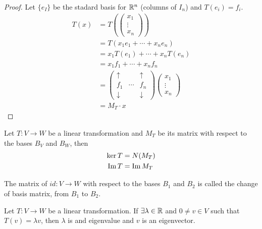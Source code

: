 \documentclass[a4paper,10pt]{article}
\begin{document}
\begin{proof}
	Let $\{e_I\}$ be the stadard basis for $\mathbb{R}^n$ (columns of $I_n$) and $T(e_i) = f_i$.
	\begin{align*}
		T(x) &= T
		\left(
			\begin{pmatrix}
				x_1 \\
				\vdots \\
				x_n
			\end{pmatrix}
		\right) \\
		&= T(x_1 e_1 + \cdots + x_n e_n) \\
		&= x_1 T(e_1) + \cdots + x_n T(e_n) \\
		&= x_1 f_1 + \cdots + x_n f_n \\
		&=
		\begin{pmatrix}
			\uparrow   &        & \uparrow \\
			f_1        & \cdots & f_n      \\
			\downarrow &        & \downarrow
		\end{pmatrix}
		\begin{pmatrix}
			x_1 \\
			\vdots \\
			x_n
		\end{pmatrix} \\
		&= M_T \cdot x
	\end{align*}
\end{proof}

\begin{cor}
	Let $T:V \to W$ be a linear transformation and $M_T$ be its
	matrix with respect to the bases $B_V$ and $B_W$, then
	\begin{align*}
		\ker T & = N(M_T) \\
		\operatorname{Im} T  & = \operatorname{Im} M_T
	\end{align*}
\end{cor}

\begin{defn}
	The matrix of $id:V \to W$ with respect to the bases $B_1$ and
	$B_2$ is called the change of basis matrix, from $B_1$ to $B_2$.
\end{defn}

\begin{defn}
	Let $T:V \to W$ be a linear transformation. If $\exists \lambda
	\in \mathbb{R}$ and $0 \neq v \in V$ such that $T(v) = \lambda v$, then
	$\lambda$ is and eigenvalue and $v$ is an eigenvector.
\end{defn}
\end{document}
